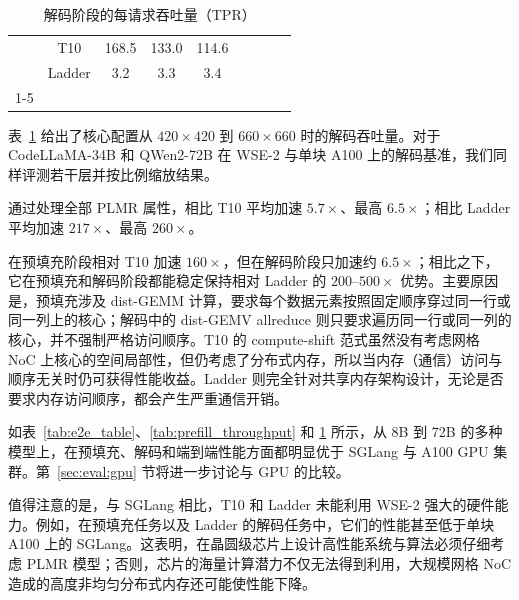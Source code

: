 \begin{table}[t]
{\begin{tabular}{c|c|ccclccc}
 & T10 & \multicolumn{1}{c|}{168.5} & \multicolumn{1}{c|}{133.0} & 114.6 & & \multicolumn{1}{c|}{} & \multicolumn{1}{c|}{} & \\
 & Ladder & \multicolumn{1}{c|}{3.2} & \multicolumn{1}{c|}{3.3} & 3.4 & & \multicolumn{1}{c|}{} & \multicolumn{1}{c|}{} & \\ \cline{1-5} \cline{7-9}
\end{tabular}%
    }
  \caption{解码阶段的每请求吞吐量（TPR）}
  \vspace{-0.2cm}
\label{tab:decode_throughput}
\end{table}

 表~\ref{tab:decode_throughput} 给出了核心配置从 $420\times420$ 到 $660\times660$ 时的解码吞吐量。对于 CodeLLaMA-34B 和 QWen2-72B 在 WSE-2 与单块 A100 上的解码基准，我们同样评测若干层并按比例缩放结果。

通过处理全部 PLMR 属性，\sys 相比 T10 平均加速 $5.7\times$、最高 $6.5\times$；相比 Ladder 平均加速 $217\times$、最高 $260\times$。

\sys 在预填充阶段相对 T10 加速 $160\times$，但在解码阶段只加速约 $6.5\times$；相比之下，它在预填充和解码阶段都能稳定保持相对 Ladder 的 $200$--$500\times$ 优势。主要原因是，预填充涉及 dist-GEMM 计算，要求每个数据元素按照固定顺序穿过同一行或同一列上的核心；解码中的 dist-GEMV allreduce 则只要求遍历同一行或同一列的核心，并不强制严格访问顺序。T10 的 compute-shift 范式虽然没有考虑网格 NoC 上核心的空间局部性，但仍考虑了分布式内存，所以当内存（通信）访问与顺序无关时仍可获得性能收益。Ladder 则完全针对共享内存架构设计，无论是否要求内存访问顺序，都会产生严重通信开销。

 如表~\ref{tab:e2e_table}、\ref{tab:prefill_throughput} 和 \ref{tab:decode_throughput} 所示，从 8B 到 72B 的多种模型上，\sys 在预填充、解码和端到端性能方面都明显优于 SGLang 与 A100 GPU 集群。第~\ref{sec:eval:gpu} 节将进一步讨论与 GPU 的比较。

值得注意的是，与 SGLang 相比，T10 和 Ladder 未能利用 WSE-2 强大的硬件能力。例如，在预填充任务以及 Ladder 的解码任务中，它们的性能甚至低于单块 A100 上的 SGLang。这表明，在晶圆级芯片上设计高性能系统与算法必须仔细考虑 PLMR 模型；否则，芯片的海量计算潜力不仅无法得到利用，大规模网格 NoC 造成的高度非均匀分布式内存还可能使性能下降。

\vspace{-0.2cm}
\subsection{\gemm}\label{sec:eval:meshgemm}
\vspace{-0.2cm}

